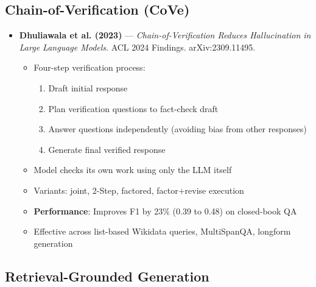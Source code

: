 \documentclass[11pt,letterpaper]{article}
\begin{document}
\subsection{Chain-of-Verification (CoVe)}

\begin{itemize}[leftmargin=*]
\item \textbf{Dhuliawala et al. (2023)} --- \textit{Chain-of-Verification Reduces Hallucination in Large Language Models}. ACL 2024 Findings. arXiv:2309.11495.
  \begin{itemize}
  \item Four-step verification process:
    \begin{enumerate}
    \item Draft initial response
    \item Plan verification questions to fact-check draft
    \item Answer questions independently (avoiding bias from other responses)
    \item Generate final verified response
    \end{enumerate}
  \item Model checks its own work using only the LLM itself
  \item Variants: joint, 2-Step, factored, factor+revise execution
  \item \textbf{Performance}: Improves F1 by 23\% (0.39 to 0.48) on closed-book QA
  \item Effective across list-based Wikidata queries, MultiSpanQA, longform generation
  \end{itemize}
\end{itemize}

\subsection{Retrieval-Grounded Generation}
\end{document}
